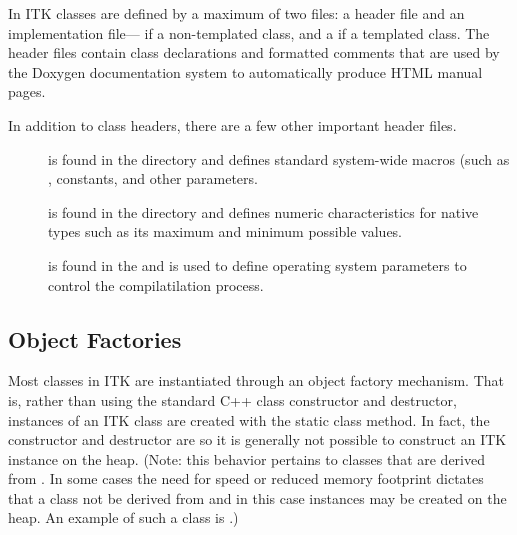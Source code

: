 In ITK classes are defined by a maximum of two files: a header  file
and an implementation file--- if a non-templated class, and a
 if a templated class.
The header files contain class declarations
and formatted comments that are used by the Doxygen documentation
system to automatically produce HTML manual pages.

In addition to class headers, there are a few other important header files.
\begin{description}
        \item[] is found in the  directory
        and defines standard system-wide macros (such as ,
        constants, and other parameters.

        \item[] is found in the  
        directory and defines numeric characteristics for native types such
        as its maximum and minimum possible values.

        \item[] is found in the  
        and is used to define operating system parameters to control
        the compilatilation process.
\end{description}

\subsection{Object Factories}
\label{sec:ObjectFactories}

Most classes in ITK are instantiated through an object factory
mechanism. That is, rather than using the standard C++ class constructor and
destructor, instances of an ITK class are created with the static class
 method. In fact, the constructor and destructor are
 so it is generally not possible to construct an ITK
instance on the heap. (Note: this behavior pertains to classes that are
derived from . In some cases the need for speed or
reduced memory footprint dictates that a class not be derived from
 and in this case instances may be created on the heap. An
example of such a class is .)

